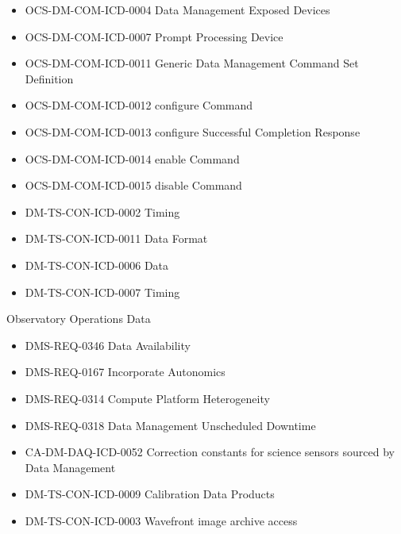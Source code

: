 \begin{itemize}
\item OCS-DM-COM-ICD-0004 Data Management Exposed Devices
\item OCS-DM-COM-ICD-0007 Prompt Processing Device
\item OCS-DM-COM-ICD-0011 Generic Data Management Command Set Definition
\item OCS-DM-COM-ICD-0012 configure Command
\item OCS-DM-COM-ICD-0013 configure Successful Completion Response
\item OCS-DM-COM-ICD-0014 enable Command
\item OCS-DM-COM-ICD-0015 disable Command
\item DM-TS-CON-ICD-0002 Timing
\item DM-TS-CON-ICD-0011 Data Format
\item DM-TS-CON-ICD-0006 Data
\item DM-TS-CON-ICD-0007 Timing
\end{itemize}
Observatory Operations Data \begin{itemize}
\item DMS-REQ-0346 Data Availability
\item DMS-REQ-0167 Incorporate Autonomics
\item DMS-REQ-0314 Compute Platform Heterogeneity
\item DMS-REQ-0318 Data Management Unscheduled Downtime
\item CA-DM-DAQ-ICD-0052 Correction constants for science sensors sourced by Data Management
\item DM-TS-CON-ICD-0009 Calibration Data Products
\item DM-TS-CON-ICD-0003 Wavefront image archive access
\end{itemize}
